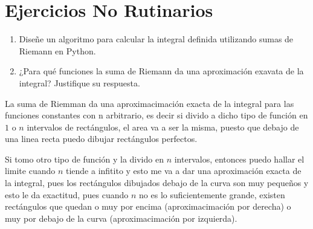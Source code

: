 \section{Ejercicios No Rutinarios}

\begin{enumerate}
    \item Diseñe un algoritmo para calcular la integral definida utilizando sumas de Riemann en Python.
\end{enumerate}



\begin{enumerate}
    \setcounter{enumi}{1}
    \item ¿Para qué funciones la suma de Riemann da una aproximación exavata de la integral? Justifique su respuesta.
\end{enumerate}

La suma de Riemman da una aproximacimación exacta de la integral para las
funciones constantes con n arbitrario, es decir si divido a dicho tipo de
función en $1$ o $n$ intervalos de rectángulos, el area va a ser la misma,
puesto que debajo de una linea recta puedo dibujar rectángulos perfectos.

Si tomo otro tipo de función y la divido en $n$ intervalos, entonces puedo hallar
el limite cuando $n$ tiende a infitito y esto me va a dar una aproximación exacta
de la integral, pues los rectángulos dibujados debajo de la curva son muy pequeños
y esto le da exactitud, pues cuando $n$ no es lo suficientemente grande, existen
rectángulos que quedan o muy por encima (aproximacimación por derecha) o muy por debajo de la curva (aproximacimación por izquierda).